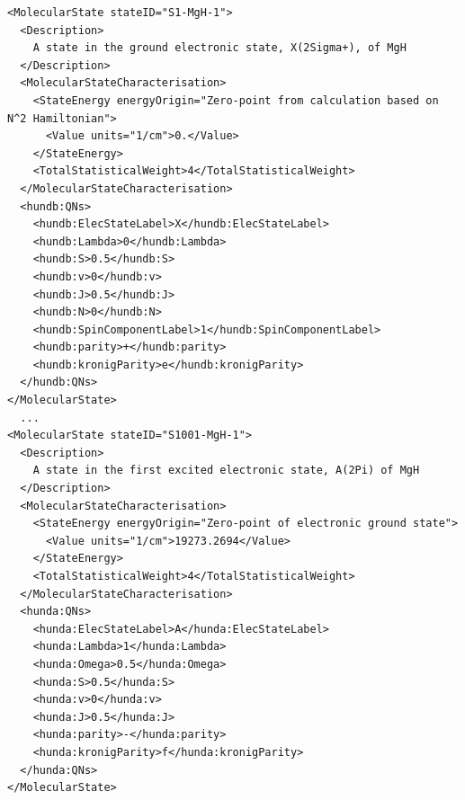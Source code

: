 \documentclass[a4paper]{article} \pagestyle{plain}
\begin{document}
\begin{verbatim}
<MolecularState stateID="S1-MgH-1">
  <Description>
    A state in the ground electronic state, X(2Sigma+), of MgH
  </Description>
  <MolecularStateCharacterisation>
    <StateEnergy energyOrigin="Zero-point from calculation based on N^2 Hamiltonian">
      <Value units="1/cm">0.</Value>
    </StateEnergy>
    <TotalStatisticalWeight>4</TotalStatisticalWeight>
  </MolecularStateCharacterisation>
  <hundb:QNs>
    <hundb:ElecStateLabel>X</hundb:ElecStateLabel>
    <hundb:Lambda>0</hundb:Lambda>
    <hundb:S>0.5</hundb:S>
    <hundb:v>0</hundb:v>
    <hundb:J>0.5</hundb:J>
    <hundb:N>0</hundb:N>
    <hundb:SpinComponentLabel>1</hundb:SpinComponentLabel>
    <hundb:parity>+</hundb:parity>
    <hundb:kronigParity>e</hundb:kronigParity>
  </hundb:QNs>
</MolecularState>
  ...
<MolecularState stateID="S1001-MgH-1">
  <Description>
    A state in the first excited electronic state, A(2Pi) of MgH
  </Description>
  <MolecularStateCharacterisation>
    <StateEnergy energyOrigin="Zero-point of electronic ground state">
      <Value units="1/cm">19273.2694</Value>
    </StateEnergy>
    <TotalStatisticalWeight>4</TotalStatisticalWeight>
  </MolecularStateCharacterisation>
  <hunda:QNs>
    <hunda:ElecStateLabel>A</hunda:ElecStateLabel>
    <hunda:Lambda>1</hunda:Lambda>
    <hunda:Omega>0.5</hunda:Omega>
    <hunda:S>0.5</hunda:S>
    <hunda:v>0</hunda:v>
    <hunda:J>0.5</hunda:J>
    <hunda:parity>-</hunda:parity>
    <hunda:kronigParity>f</hunda:kronigParity>
  </hunda:QNs>
</MolecularState>
\end{verbatim}



\end{document}
